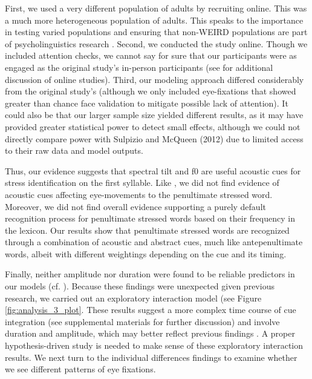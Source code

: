 First, we used a very different population of adults by recruiting online. This was a much more heterogeneous population of adults. This speaks to the importance in testing varied populations and ensuring that non-WEIRD populations are part of psycholinguistics research \citep{frost2021investigating}. Second, we conducted the study online. Though we included attention checks, we cannot say for sure that our participants were as engaged as the original study's in-person participants (see \cite{rodd2024moving} for additional discussion of online studies). Third, our modeling approach differed considerably from the original study's (although we only included eye-fixations that showed greater than chance face validation to mitigate possible lack of attention). It could also be that our larger sample size yielded different results, as it may have provided greater statistical power to detect small effects, although we could not directly compare power with Sulpizio and McQueen (2012) due to limited access to their raw data and model outputs.

Thus, our evidence suggests that spectral tilt and f0 are useful acoustic cues for stress identification on the first syllable. Like \cite{Sulpizio_McQueen_2012}, we did not find evidence of acoustic cues affecting eye-movements to the penultimate stressed word. Moreover, we did not find overall evidence supporting a purely default recognition process for penultimate stressed words based on their frequency in the lexicon. Our results show that penultimate stressed words are recognized through a combination of acoustic and abstract cues, much like antepenultimate words, albeit with different weightings depending on the cue and its timing.

Finally, neither amplitude nor duration were found to be reliable predictors in our models (cf. \cite{Alfano2006, Alfano2009, Tagliapietra2005}). Because these findings were unexpected given previous research, we carried out an exploratory interaction model (see Figure \ref{fig:analysis_3_plot}. These results suggest a more complex time course of cue integration (see supplemental materials for further discussion) and involve duration and amplitude, which may better reflect previous findings \citep{Alfano2006, Alfano2009, Tagliapietra2005}. A proper hypothesis-driven study is needed to make sense of these exploratory interaction results. We next turn to the individual differences findings to examine whether we see different patterns of eye fixations.



